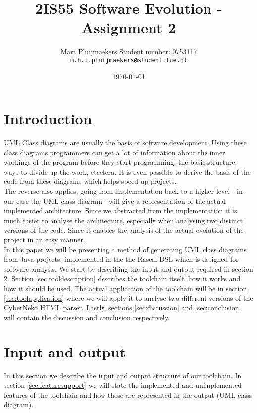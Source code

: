 \documentclass[a4paper,twoside,11pt]{article}
\title{\sffamily\bfseries 2IS55 Software Evolution - Assignment 2}
\author{Mart Pluijmaekers \qquad Student number: 0753117 \\{\tt m.h.l.pluijmaekers@student.tue.nl}}
\date{\today}
\begin{document}
\maketitle
\tableofcontents
\newpage


\section{Introduction}
UML Class diagrams are usually the basis of software development. Using these class diagrams programmers can get a lot of information about the inner workings of the program before they start programming: the basic structure, ways to divide up the work, etcetera. It is even possible to derive the basis of the code from these diagrams which helps speed up projects. \\

The reverse also applies, going from implementation back to a higher level - in our case the UML class diagram - will give a representation of the actual implemented architecture. Since we abstracted from the implementation it is much easier to analyse the architecture, especially when analysing two distinct versions of the code. Since it enables the analysis of the actual evolution of the project in an easy manner. \\

In this paper we will be presenting a method of generating UML class diagrams from Java projects, implemented in the the Rascal\cite{url:rascal} DSL which is designed for software analysis.  We start by describing the input and output required in section \ref{sec:inputoutput}. Section \ref{sec:tooldescription} describes the toolchain itself, how it works and how it should be used. The actual application of the toolchain will be in section \ref{sec:toolapplication} where we will apply it to analyse two different versions of the CyberNeko HTML parser\cite{url:cyberneko}. Lastly,  sections  \ref{sec:discussion} and  \ref{sec:conclusion} will contain the discussion and conclusion respectively.


\section{Input and output}
\label{sec:inputoutput}
In this section we describe the input and output structure of our toolchain. In section \ref{sec:featuresupport} we will state the implemented and unimplemented features of the toolchain and how these are represented in the output (UML class diagram).
\end{document}
